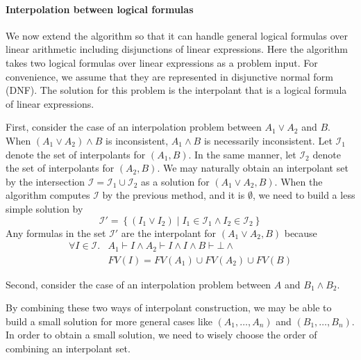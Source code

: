 \paragraph{Interpolation between logical formulas}
We now extend the algorithm so that it can handle general logical
formulas over linear arithmetic including disjunctions of linear
expressions.  Here the algorithm takes two logical formulas over
linear expressions as a problem input.  For convenience, we assume
that they are represented in disjunctive normal form (DNF).  The
solution for this problem is the interpolant that is a logical formula
of linear expressions.

First, consider the case of an interpolation problem between $A_1 \vee
A_2$ and $B$.  When $(A_1 \vee A_2) \wedge B$ is inconsistent, $A_1
\wedge B$ is necessarily inconsistent.  Let $\mathcal{I}_1$ denote the
set of interpolants for $(A_1, B)$.  In the same manner, let
$\mathcal{I}_2$ denote the set of interpolants for $(A_2, B)$.  We may
naturally obtain an interpolant set by the intersection $\mathcal{I} =
\mathcal{I}_1 \cup \mathcal{I}_2$ as a solution for $(A_1 \vee A_2,
B)$.  When the algorithm computes $\mathcal{I}$ by the previous
method, and it is $\emptyset$, we need to build a less simple solution
by
\[ \mathcal{I}' = \left\lbrace \left( I_1 \vee I_2 \right) \mid
I_1 \in \mathcal{I}_1 \wedge I_2 \in \mathcal{I}_2 \right\rbrace \]
Any formulas in the set $\mathcal{I}'$ are the interpolant for $(A_1
\vee A_2, B)$ because
\begin{align*}
\forall I \in \mathcal{I}. & A_1 \vdash I \wedge A_2 \vdash I \wedge I \wedge B \vdash \bot \wedge \\
& FV(I) = FV(A_1) \cup FV(A_2) \cup FV(B)
\end{align*}

Second, consider the case of an interpolation problem between $A$ and
$B_1 \wedge B_2$.

By combining these two ways of interpolant construction, we may be
able to build a small solution for more general cases like $(A_1,
\ldots, A_n)$ and $(B_1, \ldots, B_n)$.  In order to obtain a small
solution, we need to wisely choose the order of combining an
interpolant set.
